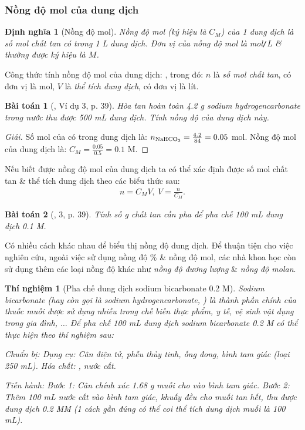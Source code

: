 \documentclass{article}
\newtheorem{baitoan}{Bài toán}
\newtheorem{dinhnghia}{Định nghĩa}
\newtheorem{thinghiem}{Thí nghiệm}
\begin{document}
\subsubsection{Nồng độ mol của dung dịch}

\begin{dinhnghia}[Nồng độ mol]
	\emph{Nồng độ mol} (ký hiệu là $C_M$) của 1 dung dịch là số mol chất tan có trong \emph{1 L} dung dịch. Đơn vị của nồng độ mol là \emph{mol\texttt{/}L} \& thường được ký hiệu là $M$.
\end{dinhnghia}
Công thức tính nồng độ mol của dung dịch: , trong đó: $n$ là \textit{số mol chất tan}, có đơn vị là mol, $V$ là \textit{thể tích dung dịch}, có đơn vị là lít.

\begin{baitoan}[\cite{SGK_KHTN_8_Canh_Dieu}, Ví dụ 3, p. 39]
	Hòa tan hoàn toàn \emph{4.2 g} sodium hydrogencarbonate \emph{} trong nước thu được \emph{500 mL} dung dịch. Tính nồng độ của dung dịch này.
\end{baitoan}

\begin{proof}[Giải]
	Số mol của  có trong dung dịch là: $n_{\rm NaHCO_3} = \frac{4.2}{84} = 0.05$ mol. Nồng độ mol của dung dịch  là: $C_M = \frac{0.05}{0.5} = 0.1$ M.
\end{proof}
Nếu biết được nồng độ mol của dung dịch ta có thể xác định được số mol chất tan \& thể tích dung dịch theo các biểu thức sau:
\begin{align*}
	\boxed{n = C_MV,\ V = \frac{n}{C_M}.}
\end{align*}

\begin{baitoan}[\cite{SGK_KHTN_8_Canh_Dieu}, 3, p. 39]
	Tính số \emph{g} chất tan cần pha để pha chế \emph{100 mL} dung dịch \emph{ 0.1 M}.
\end{baitoan}
Có nhiều cách khác nhau để biểu thị nồng độ dung dịch. Để thuận tiện cho việc nghiên cứu, ngoài việc sử dụng nồng độ \% \& nồng độ mol, các nhà khoa học còn sử dụng thêm các loại nồng độ khác như \textit{nồng độ đương lượng} \& \textit{nồng độ molan}.

\begin{thinghiem}[Pha chế dung dịch sodium bicarbonate 0.2 M]
	Sodium bicarbonate (hay còn gọi là sodium hydrogencarbonate, ) là thành phần chính của thuốc muối được sử dụng nhiều trong chế biến thực phẩm, y tế, vệ sinh vật dụng trong gia đình, $\ldots$ Để pha chế 100 mL dung dịch sodium bicarbonate 0.2 M có thể thực hiện theo thí nghiệm sau:
	
	\emph{Chuẩn bị:} Dụng cụ: Cân điện tử, phễu thủy tinh, ống đong, bình tam giác (loại \emph{250 mL}). Hóa chất: \emph{}, nước cất.
	
	\emph{Tiến hành:} Bước 1: Cân chính xác \emph{1.68 g} muối \emph{} cho vào bình tam giác. Bước 2: Thêm \emph{100 mL} nước cất vào bình tam giác, khuấy đều cho muối tan hết, thu được dung dịch \emph{ 0.2 M}M (1 cách gần đúng có thể coi thể tích dung dịch muối  là 100 mL).
\end{thinghiem}
\end{document}
